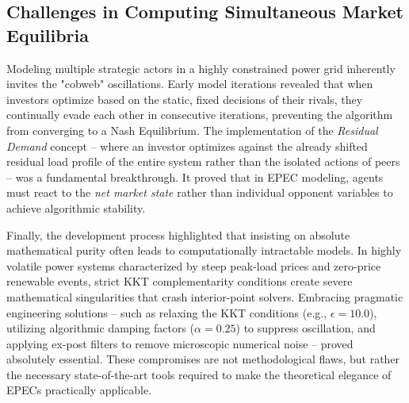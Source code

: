 \subsection{Challenges in Computing Simultaneous Market Equilibria}
Modeling multiple strategic actors in a highly constrained power grid inherently invites the "cobweb" oscillations. Early model iterations revealed that when investors optimize based on the static, fixed decisions of their rivals, they continually evade each other in consecutive iterations, preventing the algorithm from converging to a Nash Equilibrium. The implementation of the \textit{Residual Demand} concept -- where an investor optimizes against the already shifted residual load profile of the entire system rather than the isolated actions of peers -- was a fundamental breakthrough. It proved that in EPEC modeling, agents must react to the \textit{net market state} rather than individual opponent variables to achieve algorithmic stability.

Finally, the development process highlighted that insisting on absolute mathematical purity often leads to computationally intractable models. In highly volatile power systems characterized by steep peak-load prices and zero-price renewable events, strict KKT complementarity conditions create severe mathematical singularities that crash interior-point solvers. Embracing pragmatic engineering solutions -- such as relaxing the KKT conditions (e.g., $\epsilon = 10.0$), utilizing algorithmic damping factors ($\alpha = 0.25$) to suppress oscillation, and applying ex-post filters to remove microscopic numerical noise -- proved absolutely essential. These compromises are not methodological flaws, but rather the necessary state-of-the-art tools required to make the theoretical elegance of EPECs practically applicable.

